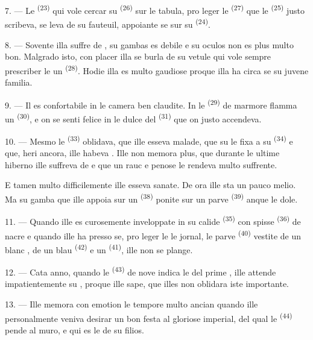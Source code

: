 7. --- Le  \textsuperscript{(23)} qui vole cercar su
 \textsuperscript{(26)} sur le tabula, pro leger le
 \textsuperscript{(27)} que le 
\textsuperscript{(25)} justo scribeva, se leva de su fauteuil, appoiante se sur
su  \textsuperscript{(24)}.

8. --- Sovente illa suffre de , su gambas es debile e su oculos non es plus multo bon.
Malgrado isto, con placer illa se burla de su vetule  qui vole
sempre prescriber le un  \textsuperscript{(28)}. Hodie illa es
multo gaudiose proque illa ha circa se su juvene familia.

9. --- Il es confortabile in le camera ben claudite. In le 
\textsuperscript{(29)} de marmore flamma un 
\textsuperscript{(30)}, e on se senti felice in le dulce  del
 \textsuperscript{(31)} que on justo accendeva.

\VUsaut{4.2mm}
\VUsaut{3.0mm}

10. --- Mesmo le  \textsuperscript{(33)} oblidava, que ille esseva
malade, que su  le fixa a su 
\textsuperscript{(34)} e que, heri ancora, ille habeva . Ille non memora plus, que durante le ultime hiberno ille suffreva de
 e que un rauc e penose  le rendeva multo
suffrente.

E tamen multo difficilemente ille esseva sanate. De ora ille sta un pauco melio.
Ma su gamba que ille appoia sur un  \textsuperscript{(38)}
ponite sur un parve  \textsuperscript{(39)} anque le dole.

11. --- Quando ille es curosemente inveloppate in su calide  \textsuperscript{(35)} con spisse 
\textsuperscript{(36)} de nacre e quando ille ha presso se, pro leger le le
jornal, le parve  \textsuperscript{(40)} vestite de un blanc
, de un blau  \textsuperscript{(42)} e un
 \textsuperscript{(41)}, ille non se plange.

12. --- Cata anno, quando le  \textsuperscript{(43)} de nove
indica le  del prime , ille attende impatientemente
su , proque ille sape, que illes non oblidara iste 
importante.

13. --- Ille memora con emotion le tempore multo ancian quando ille personalmente
veniva desirar un bon festa al gloriose  imperial, del qual le
 \textsuperscript{(44)} pende al muro, e qui es le
 de su filios.
\VUsaut{6.0mm}
\VUfilet{22mm}
